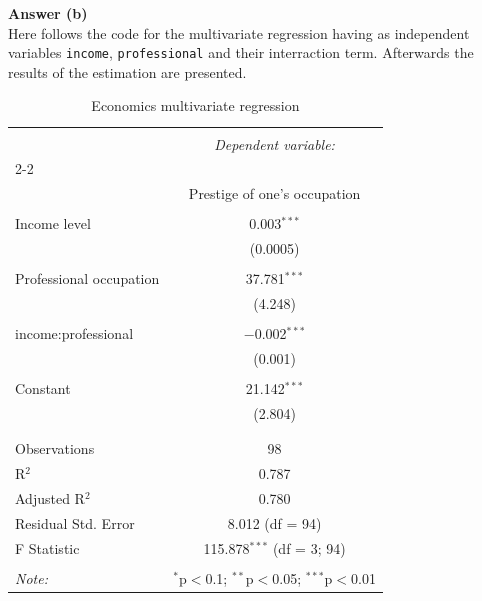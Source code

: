 \documentclass[12pt,letterpaper]{article}
\begin{document}
\vspace{1cm}
\noindent\textbf{Answer (b)}\\

\vspace{0.5cm}
Here follows the code for the multivariate regression having as independent variables \texttt{income}, \texttt{professional} and their interraction term. Afterwards the results of the estimation are presented. 
 

\vspace{0.5cm}
\begin{table}[!htbp] \centering 
	\caption{Economics multivariate regression} 
	\label{} 
	\begin{tabular}{@{\extracolsep{5pt}}lc} 
		\\[-1.8ex]\hline 
		\hline \\[-1.8ex] 
		& \multicolumn{1}{c}{\textit{Dependent variable:}} \\ 
		\cline{2-2} 
		\\[-1.8ex] & Prestige of one's occupation \\ 
		\hline \\[-1.8ex] 
		Income level & 0.003$^{***}$ \\ 
		& (0.0005) \\ 
		& \\ 
		Professional occupation & 37.781$^{***}$ \\ 
		& (4.248) \\ 
		& \\ 
		income:professional & $-$0.002$^{***}$ \\ 
		& (0.001) \\ 
		& \\ 
		Constant & 21.142$^{***}$ \\ 
		& (2.804) \\ 
		& \\ 
		\hline \\[-1.8ex] 
		Observations & 98 \\ 
		R$^{2}$ & 0.787 \\ 
		Adjusted R$^{2}$ & 0.780 \\ 
		Residual Std. Error & 8.012 (df = 94) \\ 
		F Statistic & 115.878$^{***}$ (df = 3; 94) \\ 
		\hline 
		\hline \\[-1.8ex] 
		\textit{Note:}  & \multicolumn{1}{r}{$^{*}$p$<$0.1; $^{**}$p$<$0.05; $^{***}$p$<$0.01} \\ 
	\end{tabular} 
\end{table} 
\end{document}
